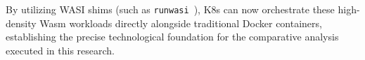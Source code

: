 \begin{enumerate}
\end{enumerate}

\begin{sloppypar}
By utilizing \acs{WASI} shims (such as \texttt{runwasi}~\cite{runwasi2024}), \acs{K8s} can now orchestrate these high-density \acs{Wasm} workloads directly alongside traditional Docker containers, establishing the precise technological foundation for the comparative analysis executed in this research.
\end{sloppypar}

